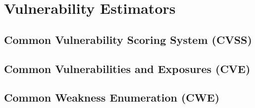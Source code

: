 \section{Vulnerability Estimators}

\subsection{Common Vulnerability Scoring System (CVSS)}
\subsection{Common Vulnerabilities and Exposures (CVE)}
\subsection{Common Weakness Enumeration (CWE)}